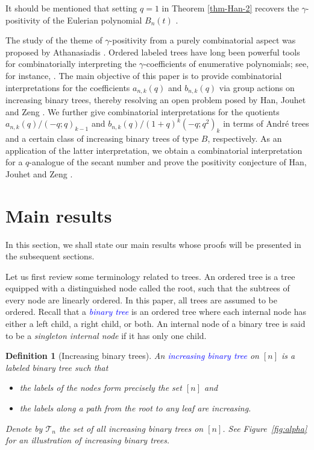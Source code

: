 \documentclass[12pt]{article}
\def\blue{\textcolor{blue}}
\def\blue{\textcolor{blue}}
\numberwithin{equation}{section}
\def\blue{\textcolor{blue}}
\def\blue{\textcolor{blue}}
\theoremstyle{plain}
\newtheorem{definition}[theorem]{Definition}
\def\B{\mathcal{T}}
\begin{document}
	 It should be mentioned that setting $q=1$ in Theorem \ref{thm-Han-2} recovers the $\gamma$-positivity of the Eulerian polynomial  $B_n(t)$ \cite{Chow2008expansions, Petersen2007peakalgebras, Stembridge2008coxetercones}. 
	  
	  
	  
	   The study of the theme of  $\gamma$-positivity from a purely combinatorial aspect was proposed by Athanasiadis \cite{Athanasiadis2018gamma}. 
	     Ordered labeled trees have long been   powerful   tools for combinatorially interpreting the $\gamma$-coefficients of enumerative polynomials; see, for instance, \cite{ChenFuYan2023gessel, LinXuZhao2022multigamma, YanHuangYang2022partialgamma, YanYangLin2026bigamma}.     
	  The main objective of this paper is 
  to provide combinatorial interpretations for the coeﬃcients $a_{n,k}(q)$ and $b_{n,k}(q)$ via group actions  on   increasing binary trees, thereby resolving an open problem posed by Han, Jouhet and Zeng 
	 \cite[Problem 11]{HanJouhetZeng2013qtriangles}. We further give combinatorial interpretations for the quotients ${a_{n,k}(q)/(-q;q)_{k-1}}$ and 
	 ${b_{n,k}(q)/(1+q)^k(-q;q^2)_k}$ 
	 in terms of Andr\'e trees and a certain class of increasing
	 binary trees of type $B$, respectively. As an application of the latter
	 interpretation, we obtain a combinatorial  interpretation   for   a $q$-analogue of the secant number    and prove the positivity conjecture of Han, Jouhet and
	 Zeng \cite[Conjecture 8]{HanJouhetZeng2013qtriangles}.
	 
	 
	 \section{Main results}
	 
	 In this section, we shall state our main results whose proofs will be presented in the
	 subsequent sections.
	 
	 Let us first review some terminology related to trees. An ordered tree is a tree equipped with a distinguished node called the root, such that the subtrees of every node are linearly ordered. In this paper, all trees are assumed to be ordered.
	Recall that  a  \blue{\em binary tree} is an ordered  tree where each internal node has either a left child, a right child, or both.   An internal node of a binary tree is said to be a {\em singleton internal node} if it has only one child.  
	
	
	
	
	\begin{definition}[Increasing binary trees]
		  An  \blue{  increasing binary  tree} on $[n]$ is a labeled  binary tree   such that
		\begin{itemize} 
			\item  the labels of the nodes form precisely the set $[n]$ and
			\item  the labels along a path from the root to any leaf are  increasing.
		\end{itemize}
		Denote by $\B_n$ the set of all   increasing binary trees on $[n]$.  See Figure~\ref{fig:alpha} for an illustration of increasing binary trees.
	\end{definition}
	 
\end{document}
